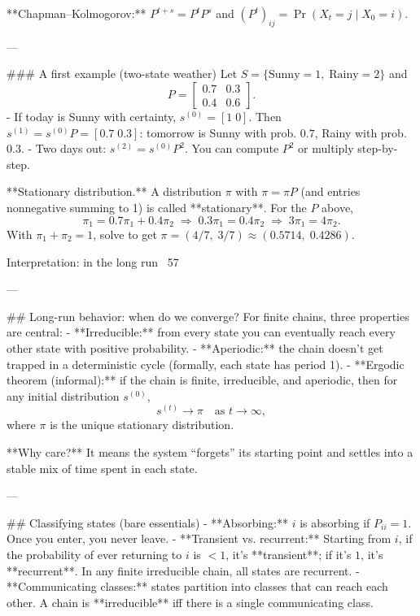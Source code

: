**Chapman–Kolmogorov:** $P^{t+s}=P^tP^s$ and $(P^t)_{ij}=\Pr(X_t=j\mid X_0=i)$.

---

### A first example (two-state weather)
Let $S=\{\text{Sunny}=1,\;\text{Rainy}=2\}$ and
$$
P=\begin{bmatrix}
0.7 & 0.3\\
0.4 & 0.6
\end{bmatrix}.
$$
- If today is Sunny with certainty, $s^{(0)}=[1\;0]$. Then $s^{(1)}=s^{(0)}P=[0.7\;0.3]$: tomorrow is Sunny with prob. $0.7$, Rainy with prob. $0.3$.
- Two days out: $s^{(2)}=s^{(0)}P^2$. You can compute $P^2$ or multiply step-by-step.

**Stationary distribution.** A distribution $\pi$ with $\pi=\pi P$ (and entries nonnegative summing to 1) is called **stationary**. For the $P$ above,
$$
\pi_1=0.7\pi_1+0.4\pi_2 \;\Rightarrow\; 0.3\pi_1=0.4\pi_2 \;\Rightarrow\; 3\pi_1=4\pi_2.
$$
With $\pi_1+\pi_2=1$, solve to get $\pi=(4/7,\;3/7)\approx(0.5714,\;0.4286)$.

Interpretation: in the long run ~57%

---

## Long-run behavior: when do we converge?
For finite chains, three properties are central:
- **Irreducible:** from every state you can eventually reach every other state with positive probability.
- **Aperiodic:** the chain doesn’t get trapped in a deterministic cycle (formally, each state has period 1).
- **Ergodic theorem (informal):** if the chain is finite, irreducible, and aperiodic, then for any initial distribution $s^{(0)}$,
  $$
  s^{(t)} \to \pi\quad\text{as }t\to\infty,
  $$
  where $\pi$ is the unique stationary distribution.

**Why care?** It means the system “forgets” its starting point and settles into a stable mix of time spent in each state.

---

## Classifying states (bare essentials)
- **Absorbing:** $i$ is absorbing if $P_{ii}=1$. Once you enter, you never leave.
- **Transient vs. recurrent:** Starting from $i$, if the probability of ever returning to $i$ is $<1$, it’s **transient**; if it’s $1$, it’s **recurrent**. In any finite irreducible chain, all states are recurrent.
- **Communicating classes:** states partition into classes that can reach each other. A chain is **irreducible** iff there is a single communicating class.

